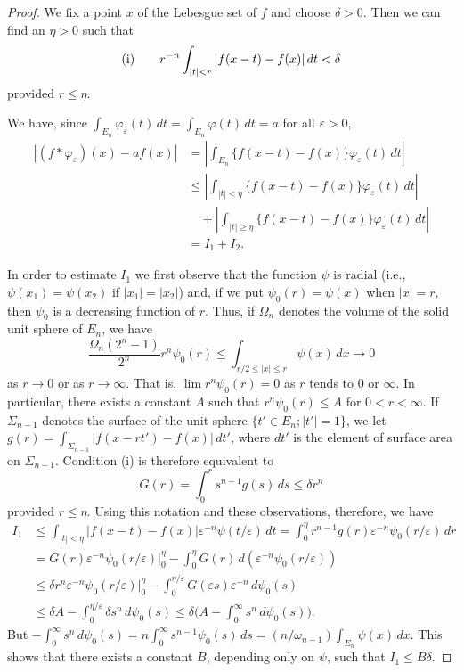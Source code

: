 \begin{proof}
We fix a point $x$ of the Lebesgue set of $f$ and choose $\delta > 0$. Then we
can find an $\eta > 0$ such that
\[
\textup{(i)}\qquad
r^{-n}\int_{|t|<r}|f(x-t)-f(x)|\,dt<\delta
\]
provided $r \leq \eta$.

We have, since $\int_{E_{n}}\varphi_{\varepsilon}(t)\,dt=\int_{E_{n}}\varphi(t)\,dt=a$
for all $\varepsilon>0$,
\begin{align*}
|(f*\varphi_{\varepsilon})(x)-af(x)|
&=\left|\int_{E_{n}}\{f(x-t)-f(x)\}\varphi_{\varepsilon}(t)\,dt\right|\\
&\leq\left|\int_{|t|<\eta}\{f(x-t)-f(x)\}\varphi_{\varepsilon}(t)\,dt\right|\\
&\quad+\left|\int_{|t|\geq\eta}\{f(x-t)-f(x)\}\varphi_{\varepsilon}(t)\,dt\right|\\
&=I_{1}+I_{2}.
\end{align*}

In order to estimate $I_{1}$ we first observe that the function $\psi$ is radial
(i.e., $\psi(x_{1})=\psi(x_{2})$ if $|x_{1}|=|x_{2}|$) and, if we put
$\psi_{0}(r)=\psi(x)$ when $|x|=r$, then $\psi_{0}$ is a decreasing function of
$r$. Thus, if $\Omega_{n}$ denotes the volume of the solid unit sphere of
$E_{n}$, we have
\[
\frac{\Omega_{n}(2^{n}-1)}{2^{n}}r^{n}\psi_{0}(r)\leq\int_{r/2\leq|x|\leq r}\psi(x)\,dx\to0
\]
as $r \to 0$ or as $r \to \infty$. That is, $\lim r^{n} \psi_{0}(r) = 0$ as $r$
tends to $0$ or $\infty$. In particular, there exists a constant $A$ such that
$r^{n} \psi_{0}(r) \leq A$ for $0 < r < \infty$. If $\Sigma_{n-1}$ denotes the
surface of the unit sphere $\{t' \in E_{n}; |t'| = 1\}$, we let
$g(r) = \int_{\Sigma_{n-1}} |f(x - rt') - f(x)| \, dt'$, where $dt'$ is the
element of surface area on $\Sigma_{n-1}$. Condition (i) is therefore equivalent
to
\[
G(r)=\int_{0}^{r}s^{n-1}g(s)\,ds\leq\delta r^{n}
\]
provided $r \leq \eta$. Using this notation and these observations, therefore,
we have
\begin{align*}
I_{1}&\leq\int_{|t|<\eta}|f(x-t)-f(x)|\varepsilon^{-n}\psi(t/\varepsilon)\,dt
=\int_{0}^{\eta}r^{n-1}g(r)\varepsilon^{-n}\psi_{0}(r/\varepsilon)\,dr\\
&=G(r)\varepsilon^{-n}\psi_{0}(r/\varepsilon)\big|_{0}^{\eta}
-\int_{0}^{\eta}G(r)\,d(\varepsilon^{-n}\psi_{0}(r/\varepsilon))\\
&\leq\delta r^{n}\varepsilon^{-n}\psi_{0}(r/\varepsilon)\big|_{0}^{\eta}
-\int_{0}^{\eta/\varepsilon}G(\varepsilon s)\varepsilon^{-n}\,d\psi_{0}(s)\\
&\leq\delta A-\int_{0}^{\eta/\varepsilon}\delta s^{n}\,d\psi_{0}(s)
\leq\delta\Biggl(A-\int_{0}^{\infty}s^{n}\,d\psi_{0}(s)\Biggr).
\end{align*}
But
$-\int_{0}^{\infty}s^{n}\,d\psi_{0}(s)=n\int_{0}^{\infty}s^{n-1}\psi_{0}(s)\,ds=(n/\omega_{n-1})\int_{E_{n}}\psi(x)\,dx$.
This shows that there exists a constant $B$, depending only on $\psi$, such that
$I_{1}\leq B\delta$.


\end{proof}
